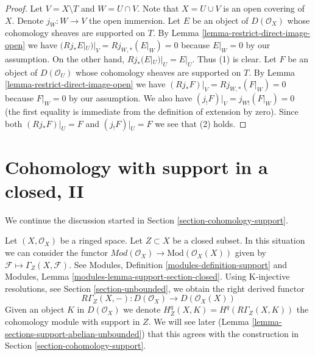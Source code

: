 \begin{proof}
Let $V = X \setminus T$ and $W = U \cap V$. Note that $X = U \cup V$ is an
open covering of $X$. Denote $j_W : W \to V$ the open immersion.
Let $E$ be an object of $D(\mathcal{O}_X)$ whose cohomology sheaves are
supported on $T$. By
Lemma \ref{lemma-restrict-direct-image-open} we have
$(Rj_*E|_U)|_V = Rj_{W, *}(E|_W) = 0$ because $E|_W = 0$ by our assumption.
On the other hand, $Rj_*(E|_U)|_U = E|_U$. Thus (1) is clear.
Let $F$ be an object of $D(\mathcal{O}_U)$ whose cohomology sheaves
are supported on $T$. By
Lemma \ref{lemma-restrict-direct-image-open} we have
$(Rj_*F)|_V = Rj_{W, *}(F|_W) = 0$ because $F|_W = 0$ by our assumption.
We also have $(j_!F)|_V = j_{W!}(F|_W) = 0$ (the first equality is immediate
from the definition of extension by zero). Since both
$(Rj_*F)|_U = F$ and $(j_!F)|_U = F$ we see that (2) holds.
\end{proof}











\section{Cohomology with support in a closed, II}
\label{section-cohomology-support-bis}

\noindent
We continue the discussion started in
Section \ref{section-cohomology-support}.

\medskip\noindent
Let $(X, \mathcal{O}_X)$ be a ringed space. Let $Z \subset X$ be
a closed subset. In this situation we can consider the functor
$\textit{Mod}(\mathcal{O}_X) \to \text{Mod}(\mathcal{O}_X(X))$
given by $\mathcal{F} \mapsto \Gamma_Z(X, \mathcal{F})$. See
Modules, Definition \ref{modules-definition-support}
and
Modules, Lemma \ref{modules-lemma-support-section-closed}.
Using K-injective resolutions, see Section \ref{section-unbounded},
we obtain the right derived functor
$$
R\Gamma_Z(X, - ) : D(\mathcal{O}_X) \to D(\mathcal{O}_X(X))
$$
Given an object $K$ in $D(\mathcal{O}_X)$ we denote
$H^q_Z(X, K) = H^q(R\Gamma_Z(X, K))$ the cohomology module with
support in $Z$. We will see later
(Lemma \ref{lemma-sections-support-abelian-unbounded}) that this
agrees with the construction in Section \ref{section-cohomology-support}.

